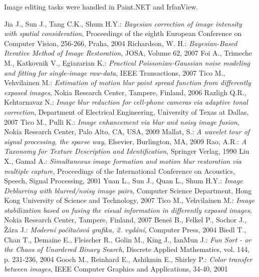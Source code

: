 \documentclass[12pt,notitlepage]{report}
\begin{document}
Image editing tasks were handled in Paint.NET and IrfanView.


\begin{thebibliography}{xxxxx-99}
 Jia J., Sun J., Tang C.K., Shum H.Y.: {\em Bayesian correction of image intensity with spatial consideration}, Proceedings of the eighth European Conference on Computer Vision, 256-266, Praha, 2004
 Richardson, W. H.: {\em Bayesian-Based Iterative Method of Image Restoration}, JOSA, Volume 62, 2007
 Foi A., Trimeche M., Katkovnik V., Egiazarian K.: {\em Practical Poissonian-Gaussian noise modeling and fitting for single-image raw-data}, IEEE Transactions, 2007
 Tico M., Vehvilainen M.: {\em  Estimation of motion blur point spread function from differently exposed images}, Nokia Research Center, Tampere, Finland, 2006
 Razligh Q.R., Kehtarnavaz N.: {\em Image blur reduction for cell-phone cameras via adaptive tonal correction}, Department of Electrical Engineering, University of Texas at Dallas, 2007
 Tico M., Pulli K.: {\em Image enhancement via blur and noisy image fusion}, Nokia Research Center, Palo Alto, CA, USA, 2009
 Mallat, S.: {\em A wavelet tour of signal processing, the sparse way}, Elsevier, Burlington, MA, 2009
 Rao, A.R.: {\em A Taxonomy for Texture Description and Identification}, Springer Verlag, 1990
 Liu X., Gamal A.: {\em Simultaneous image formation and motion blur restoration via multiple capture}, Proceedings of the International Conference on Acoustics, Speech, Signal Processing, 2001
 Yuan L., Sun J., Quan L., Shum H.Y.: {\em Image Deblurring with blurred/noisy image pairs},  Computer Science Department, Hong Kong University of Science and Technology, 2007
 Tico M., Vehvilainen M.: {\em Image stabilization based on fusing the visual information in differently exposed images}, Nokia Research Center, Tampere, Finland, 2007
 Beneš B., Felkel P., Sochor J., Žára J.: {\em Moderní počítačová grafika, 2. vydání}, Computer Press, 2004
 Biedl T., Chan T., Demaine E., Fleischer R., Golin M., King J., IanMun J.: {\em Fun Sort - or the Chaos of Unordered Binary Search},  Discrete Applied Mathematics, vol. 144, p. 231-236, 2004
 Gooch M., Reinhard E., Ashikmin E., Shirley P.: {\em Color transfer between images}, IEEE Computer Graphics and Applications, 34-40, 2001

\end{thebibliography}
\end{document}
